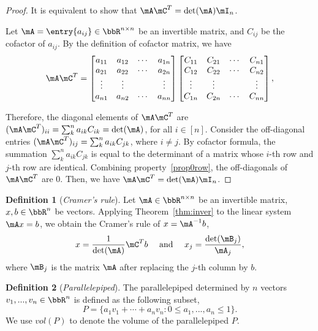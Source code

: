 \documentclass[11pt]{article}
\theoremstyle{plain}
\theoremstyle{definition}
\newtheorem{defn}{Definition}
\begin{document}
\begin{proof}
	It is equivalent to  show that $\mA \mC^T = \det(\mA) \mI_n$. 
	
	Let $\mA = \entry{a_{ij}} \in \bbR^{n \times n}$ be an invertible matrix, and $C_{ij}$ be the cofactor of $a_{ij}$. By the definition of cofactor matrix, we have
	\begin{align}
		\mA  \mC^T = \begin{bmatrix}
			a_{11} & a_{12} &\cdots &a_{1n}\\
			a_{21} & a_{22} &\cdots &a_{2n}\\
			\vdots & \vdots & & \vdots\\
			a_{n1} & a_{n2} &\cdots &a_{nn}\\
		\end{bmatrix} \begin{bmatrix}
			C_{11} & C_{21} &\cdots &C_{n1}\\
			C_{12} & C_{22} &\cdots &C_{n2}\\
			\vdots & \vdots & & \vdots\\
			C_{1n} & C_{2n} &\cdots &C_{nn}\\
		\end{bmatrix},
	\end{align}
	
	Therefore, the diagonal elements of $\mA \mC^T$ are $(\mA \mC^T)_{ii} = \sum_k^n a_{ik} C_{ik} = \det(\mA)$, for all $ i \in [n]$. Consider the off-diagonal entries $(\mA \mC^T)_{ij} = \sum_{k}^n a_{ik} C_{jk}$, where $i \neq j$. By cofactor formula, the summation   $ \sum_{k}^n a_{ik} C_{jk}$ is equal to the determinant of a matrix whose $i$-th row and $j$-th row are identical. Combining property~\ref{prop0row}, the off-diagonals of $\mA \mC^T$ are 0. Then, we have $\mA \mC^T = \det(\mA) \mI_n$.
\end{proof}

\begin{defn}[\textit{Cramer's rule}]
Let  $\mA\in\bbR^{n \times n}$  be  an invertible matrix, $ x, b \in \bbR^n$ be vectors. Applying Theorem~\ref{thm:inver} to the linear system $\mA x=b$, we obtain the Cramer's rule of $x = \mA^{-1} b$, 
\[  x = \frac{1}{\det(\mA)} \mC^T b\quad \text{ and } \quad x_j = \frac{\det(\mB_j)}{\mA_j}, \] 
	where $\mB_j$ is the matrix $\mA$ after replacing the $j$-th column by $b$.
\end{defn}

\begin{defn}[\textit{Parallelepiped}]
	The parallelepiped determined by $n$ vectors $v_1,...,v_n \in \bbR^n$ is defined as the following subset,
	\[ P = \{ a_1 v_1 + \cdots + a_n v_n \colon 0 \leq a_1,...,a_n \leq 1 \}. \]
	 We use $vol(P)$ to denote the volume of the parallelepiped  $P$. 
\end{defn}
\end{document}
